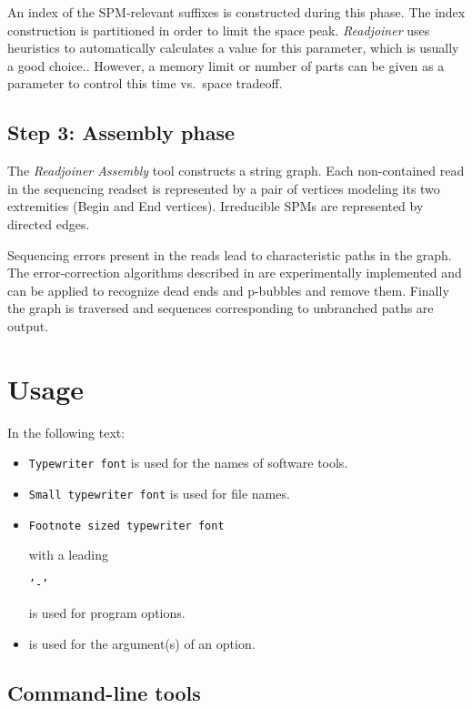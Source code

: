 \documentclass[12pt,titlepage]{article}
\newcommand{\Readjoiner}{\textit{Readjoiner}\xspace}
\newcommand{\Rdjassembly}{\textit{Readjoiner Assembly}\xspace}
\begin{document}
An index of the SPM-relevant suffixes is constructed during this phase.
The index construction is partitioned in order to limit the
space peak.
\Readjoiner uses heuristics
to automatically calculates a value for this parameter, which is usually
a good choice..
However, a memory limit or number of parts can be given as a parameter
to control this time vs.\ space tradeoff.

\subsection{Step 3: Assembly phase}

The \Rdjassembly tool constructs a string graph. Each non-contained read
in the sequencing readset is represented by a pair of vertices modeling
its two extremities (Begin and End vertices). Irreducible SPMs are represented
by directed edges.

Sequencing errors present in the reads lead to characteristic paths
in the graph. The error-correction algorithms described in \cite{Edena}
are experimentally implemented and can be applied to recognize dead ends
and p-bubbles and remove them. Finally the graph is traversed and sequences
corresponding to unbranched paths are output.

\section{Usage} \label{Usage}

In the following text:

\begin{itemize}
\item \texttt{Typewriter font} is used for the names of software tools.
\item \texttt{\small{Small typewriter font}} is used for file names.
\item \begin{footnotesize}\texttt{Footnote sized typewriter font}
      \end{footnotesize} with a leading
      \begin{footnotesize}\texttt{'-'}\end{footnotesize}
      is used for program options.
\item {} is used for the argument(s) of an
      option.
\end{itemize}

\subsection{Command-line tools} \label{Overview}
\end{document}
